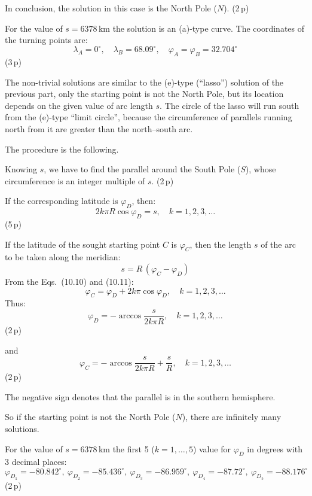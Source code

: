 \begin{description}
  In conclusion, the solution in this case is the North Pole ($N$).
  \hfill(2\,p)

  For the value of $s = 6378$\,km the solution is an (a)-type curve. The
  coordinates of the turning points are:
  \[
    \lambda_A = 0^\circ, \quad \lambda_B = 68.09^\circ, \quad
    \varphi_A = \varphi_B = 32.704^\circ
  \]
  \hfill(3\,p)

\item[2.] The non-trivial solutions are similar to the (e)-type (``lasso'')
  solution of the previous part, only the starting point is not the North Pole,
  but its location depends on the given value of arc length $s$. The circle of
  the lasso will run south from the (e)-type ``limit circle'', because the
  circumference of parallels running north from it are greater than the
  north--south arc.

  The procedure is the following.

  Knowing $s$, we have to find the parallel around the South Pole ($S$), whose
  circumference is an integer multiple of $s$. \hfill(2\,p)

  If the corresponding latitude is $\varphi_D$, then:
  \[
    2k\pi R\cos\varphi_D = s, \quad k = 1, 2, 3, \ldots \tag{10.10}
  \]
  \hfill(5\,p)

  If the latitude of the sought starting point $C$ is $\varphi_C$, then the
  length $s$ of the arc to be taken along the meridian:
  \[
    s = R\,(\varphi_C - \varphi_D) \tag{10.11}
  \]
  From the Eqs.~(10.10) and (10.11):
  \[
    \varphi_C = \varphi_D + 2k\pi\cos\varphi_D, \quad k = 1, 2, 3, \ldots
    \tag{10.12}
  \]
  Thus:
  \[
    \varphi_D = -\arccos\frac{s}{2k\pi R}, \quad k = 1, 2, 3, \ldots
    \tag{10.13}
  \]
  \hfill(2\,p)

  and
  \[
    \varphi_C = -\arccos\frac{s}{2k\pi R} + \frac{s}{R},
    \quad k = 1, 2, 3, \ldots \tag{10.14}
  \]
  \hfill(2\,p)

  The negative sign denotes that the parallel is in the southern hemisphere.

  So if the starting point is not the North Pole ($N$), there are infinitely
  many solutions.

  For the value of $s = 6378$\,km the first 5 ($k = 1, \ldots, 5$) value for
  $\varphi_D$ in degrees with 3 decimal places:
  \[
    \varphi_{D_1} = -80.842^\circ,\ \varphi_{D_2} = -85.436^\circ,\
    \varphi_{D_3} = -86.959^\circ,\ \varphi_{D_4} = -87.72^\circ,\
    \varphi_{D_5} = -88.176^\circ
  \]
  \hfill(2\,p)


\end{description}
